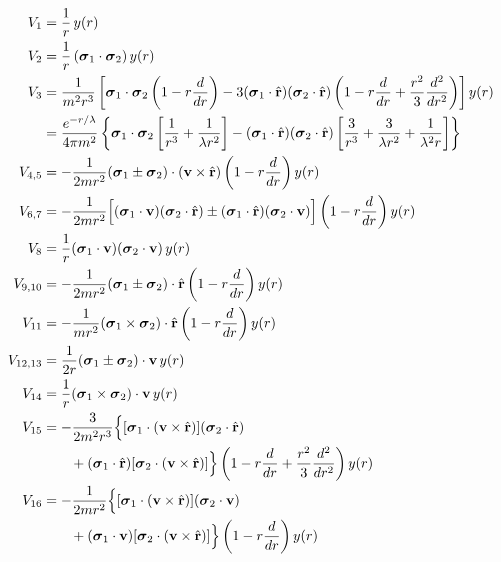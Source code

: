 \documentclass[main]{subfiles}
\begin{document}
{\small
\begin{align}
  V_1 &= \frac1r\,y(r) \label{eq:v1}\\
  V_2 &= \frac1r\,(\boldsymbol\sigma_1\cdot\boldsymbol\sigma_2)\,y(r) \label{eq:v2}\\
  V_3 &= \frac{1}{m^2r^3}\left[\boldsymbol\sigma_1\cdot\boldsymbol\sigma_2\left(1-r\frac{d}{dr}\right)
    -3(\boldsymbol\sigma_1\cdot\hat{\mathbf r})(\boldsymbol\sigma_2\cdot\hat{\mathbf r})
    \left(1-r\frac{d}{dr}+\frac{r^2}{3}\frac{d^2}{dr^2}\right)\right]y(r) \notag\\
  &= \frac{e^{-r/\lambda}}{4\pi m^2}\left\{\boldsymbol\sigma_1\cdot\boldsymbol\sigma_2
    \left[\frac1{r^3}+\frac1{\lambda r^2}\right]
    -(\boldsymbol\sigma_1\cdot\hat{\mathbf r})(\boldsymbol\sigma_2\cdot\hat{\mathbf r})
    \left[\frac3{r^3}+\frac3{\lambda r^2}+\frac1{\lambda^2r}\right]\right\} \label{eq:v3}\\
  V_{4,5} &= -\frac{1}{2mr^2}(\boldsymbol\sigma_1\pm\boldsymbol\sigma_2)\cdot(\mathbf v\times\hat{\mathbf r})
    \left(1-r\frac{d}{dr}\right)y(r) \label{eq:v45}\\
  V_{6,7} &= -\frac{1}{2mr^2}\Big[(\boldsymbol\sigma_1\cdot\mathbf v)(\boldsymbol\sigma_2\cdot\hat{\mathbf r})
    \pm(\boldsymbol\sigma_1\cdot\hat{\mathbf r})(\boldsymbol\sigma_2\cdot\mathbf v)\Big]
    \left(1-r\frac{d}{dr}\right)y(r) \label{eq:v67}\\
  V_8 &= \frac1r(\boldsymbol\sigma_1\cdot\mathbf v)(\boldsymbol\sigma_2\cdot\mathbf v)\,y(r) \label{eq:v8}\\
  V_{9,10} &= -\frac{1}{2mr^2}(\boldsymbol\sigma_1\pm\boldsymbol\sigma_2)\cdot\hat{\mathbf r}
    \left(1-r\frac{d}{dr}\right)y(r) \label{eq:v910}\\
  V_{11} &= -\frac{1}{mr^2}(\boldsymbol\sigma_1\times\boldsymbol\sigma_2)\cdot\hat{\mathbf r}
    \left(1-r\frac{d}{dr}\right)y(r) \label{eq:v11}\\
  V_{12,13} &= \frac{1}{2r}(\boldsymbol\sigma_1\pm\boldsymbol\sigma_2)\cdot\mathbf v\,y(r) \label{eq:v1213}\\
  V_{14} &= \frac1r(\boldsymbol\sigma_1\times\boldsymbol\sigma_2)\cdot\mathbf v\,y(r) \label{eq:v14}\\
  V_{15} &= -\frac{3}{2m^2r^3}\Big\{[\boldsymbol\sigma_1\cdot(\mathbf v\times\hat{\mathbf r})](\boldsymbol\sigma_2\cdot\hat{\mathbf r}) \notag\\
    &\qquad{}+(\boldsymbol\sigma_1\cdot\hat{\mathbf r})[\boldsymbol\sigma_2\cdot(\mathbf v\times\hat{\mathbf r})]\Big\}
    \left(1-r\frac{d}{dr}+\frac{r^2}{3}\frac{d^2}{dr^2}\right)y(r) \label{eq:v15}\\
  V_{16} &= -\frac{1}{2mr^2}\Big\{[\boldsymbol\sigma_1\cdot(\mathbf v\times\hat{\mathbf r})](\boldsymbol\sigma_2\cdot\mathbf v) \notag\\
    &\qquad{}+(\boldsymbol\sigma_1\cdot\mathbf v)[\boldsymbol\sigma_2\cdot(\mathbf v\times\hat{\mathbf r})]\Big\}
    \left(1-r\frac{d}{dr}\right)y(r) \label{eq:v16}
\end{align}
}
\end{document}
